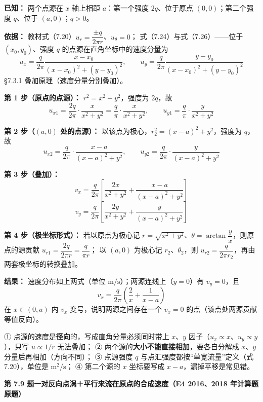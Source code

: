 \begin{jie}
\textbf{已知：} 两个点源在 $x$ 轴上相距 $a$：第一个强度 $2q$、位于原点 $(0,0)$；第二个强度 $q$、位于 $(a,0)$；$q>0$。

\textbf{依据：} 教材式（7.20）$u_r=\dfrac{\pm q}{2\pi r}$、$u_\theta=0$；
式（7.24）与式（7.26）——位于 $(x_0,y_0)$、强度 $q$ 的点源在直角坐标中的速度分量为
\[
u_x=\frac{q}{2\pi}\frac{x-x_0}{(x-x_0)^2+(y-y_0)^2},\qquad
u_y=\frac{q}{2\pi}\frac{y-y_0}{(x-x_0)^2+(y-y_0)^2}
\]
\S7.3.1 叠加原理（速度分量分别叠加）。

\textbf{第 1 步（原点的点源）：} $r^2=x^2+y^2$，强度为 $2q$，故
\[
u_{x1}=\frac{2q}{2\pi}\cdot\frac{x}{x^2+y^2}=\frac{q}{\pi}\cdot\frac{x}{x^2+y^2},\qquad
u_{y1}=\frac{q}{\pi}\cdot\frac{y}{x^2+y^2}
\]

\textbf{第 2 步（$(a,0)$ 处的点源）：} 以该点为极心，$r_2^2=(x-a)^2+y^2$，强度为 $q$，故
\[
u_{x2}=\frac{q}{2\pi}\cdot\frac{x-a}{(x-a)^2+y^2},\qquad
u_{y2}=\frac{q}{2\pi}\cdot\frac{y}{(x-a)^2+y^2}
\]

\textbf{第 3 步（叠加）：}
\[
\boxed{\,v_x=\frac{q}{2\pi}\left[\frac{2x}{x^2+y^2}+\frac{x-a}{(x-a)^2+y^2}\right]\,}
\]
\[
\boxed{\,v_y=\frac{q}{2\pi}\left[\frac{2y}{x^2+y^2}+\frac{y}{(x-a)^2+y^2}\right]\,}
\]

\textbf{第 4 步（极坐标形式）：} 若以原点为极心记 $r=\sqrt{x^2+y^2}$、$\theta=\arctan\dfrac{y}{x}$，则原点的源贡献 $u_{r1}=\dfrac{2q}{2\pi r}=\dfrac{q}{\pi r}$；
以 $(a,0)$ 为极心记 $r_2$、$\theta_2$，则 $u_{r2}=\dfrac{q}{2\pi r_2}$，再由两套极坐标的转换叠加。

\textbf{结果：} 速度分布如上两式（单位 $\mathrm{m/s}$）；两源连线上（$y=0$）有 $v_y=0$，且
\[
v_x=\frac{q}{2\pi}\left(\frac{2}{x}+\frac{1}{x-a}\right)
\]
在 $x\in(0,a)$ 内 $v_x$ 变号，说明两源之间存在一个 $v_x=0$ 的点（该点处两源贡献等值反向）。
\end{jie}

\begin{yicuo}
① 点源的速度是\textbf{径向}的，写成直角分量必须同时带上 $x$、$y$ 因子（$u_x\propto x$、$u_y\propto y$），只写 $u\propto 1/r$ 无法叠加；
② 两个源的\textbf{大小不能直接相加}，要各自分解成 $x$、$y$ 分量后再相加（方向不同）；
③ 点源强度 $q$ 与点汇强度都按“单宽流量”定义（式 7.20），单位是 $\mathrm{m^2/s}$；
④ 第二个源的 $x$ 坐标要写成 $x-a$，漏掉平移是常见错。
\end{yicuo}

\noindent\textbf{第 7.9 题\quad 一对反向点涡＋平行来流在原点的合成速度（E4 2016、2018 年计算题原题）}

